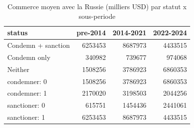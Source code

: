 \begin{table}

\caption{Commerce moyen avec la Russie (milliers USD) par statut x sous-periode}
\centering
\begin{tabular}[t]{lrrr}
\toprule
status & pre-2014 & 2014-2021 & 2022-2024\\
\midrule
Condemn + sanction & 6253453 & 8687973 & 4433515\\
Condemn only & 340982 & 739677 & 974068\\
Neither & 1508256 & 3786923 & 6860353\\
condemner: 0 & 1508256 & 3786923 & 6860353\\
condemner: 1 & 2170020 & 3198503 & 2044256\\
sanctioner: 0 & 615751 & 1454436 & 2441061\\
sanctioner: 1 & 6253453 & 8687973 & 4433515\\
\bottomrule
\end{tabular}
\end{table}
